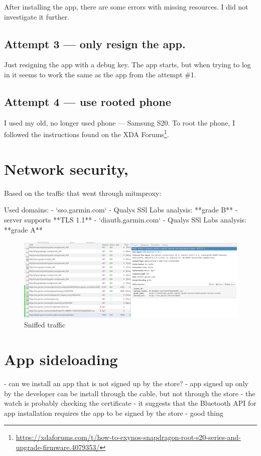 After installing the app, there are some errors with missing resources.
I did not investigate it further.

\subsection*{Attempt 3 — only resign the app.}
Just resigning the app with a debug key.
The app starts, but when trying to log in it seems to work the same as the app from the attempt \#1.

\subsection*{Attempt 4 — use rooted phone}
I used my old, no longer used phone — Samsung S20.
To root the phone, I followed the instructions found on the XDA Forums\footnote{\url{https://xdaforums.com/t/how-to-exynos-snapdragon-root-s20-series-and-upgrade-firmware.4079353/}}.

\section{Network security,}
Based on the traffic that went through mitmproxy:

Used domains:
- `sso.garmin.com` - Qualys SSl Labs analysis: **grade B**
- server supports **TLS 1.1**
- `diauth.garmin.com` - Qualys SSl Labs analysis: **grade A**

\begin{figure}[h]
    \centering
    \includegraphics[width=1\linewidth]{../../images/mitmproxy unpinner}
    \caption{Sniffed traffic}
    \label{fig:mitmproxy-unpinner}
\end{figure}

\section{App sideloading}
- can we install an app that is not signed up by the store?
- app signed up only by the developer can be install through the cable, but not through the store
- the watch is probably checking the certificate
- it suggests that the Bluetooth API for app installation requires the app to be signed by the store - good thing
